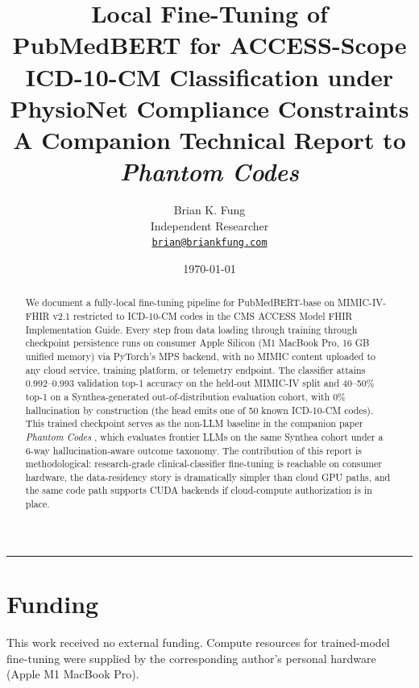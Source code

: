 \documentclass[11pt]{article}
\title{%
  Local Fine-Tuning of PubMedBERT for ACCESS-Scope ICD-10-CM
  Classification under PhysioNet Compliance Constraints \\
  \large A Companion Technical Report to \emph{Phantom Codes}}
\author{%
  Brian K. Fung \\[2pt]
  \small Independent Researcher \\[2pt]
  \small\href{mailto:brian@briankfung.com}{\texttt{brian@briankfung.com}}}
\date{\today}
\begin{document}
\maketitle

\begin{abstract}
\noindent We document a fully-local fine-tuning pipeline for
PubMedBERT-base on MIMIC-IV-FHIR v2.1 restricted to ICD-10-CM codes
in the CMS ACCESS Model FHIR Implementation Guide. Every step from
data loading through training through checkpoint persistence runs on
consumer Apple Silicon (M1 MacBook Pro, 16 GB unified memory) via
PyTorch's MPS backend, with no MIMIC content uploaded to any cloud
service, training platform, or telemetry endpoint. The classifier
attains 0.992--0.993 validation top-1 accuracy on the held-out
MIMIC-IV split and 40--50\% top-1 on a Synthea-generated
out-of-distribution evaluation cohort, with 0\% hallucination by
construction (the head emits one of 50 known ICD-10-CM codes). This
trained checkpoint serves as the non-LLM baseline in the companion
paper \emph{Phantom Codes} \autocite{FungPhantomCodes2026}, which
evaluates frontier LLMs on the same Synthea cohort under a 6-way
hallucination-aware outcome taxonomy. The contribution of this
report is methodological: research-grade clinical-classifier
fine-tuning is reachable on consumer hardware, the data-residency
story is dramatically simpler than cloud GPU paths, and the same
code path supports CUDA backends if cloud-compute authorization is
in place.
\end{abstract}

\tableofcontents
\bigskip









\bigskip
\hrule
\bigskip

\section*{Funding}
This work received no external funding. Compute resources for
trained-model fine-tuning were supplied by the corresponding
author's personal hardware (Apple M1 MacBook Pro).
\end{document}
